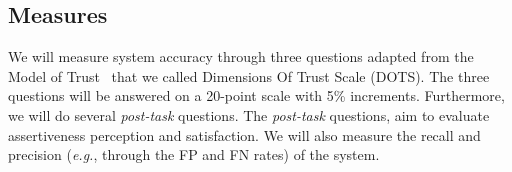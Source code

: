 \subsection{Measures}
\label{sec:sec00405}

We will measure system accuracy through three questions adapted from the Model of Trust~\cite{schoorman2016perspective} that we called Dimensions Of Trust Scale (DOTS).
The three questions will be answered on a 20-point scale with 5\% increments.
Furthermore, we will do several {\it post-task} questions.
The {\it post-task} questions, aim to evaluate assertiveness perception and satisfaction.
We will also measure the recall and precision ({\it e.g.}, through the FP and FN rates) of the system.

\clearpage